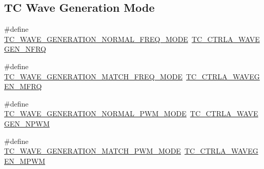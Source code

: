 \subsection*{TC Wave Generation Mode}
\begin{DoxyCompactItemize}
\item 
\#define \mbox{\hyperlink{group__asfdoc__sam0__tc__group_ga3be501afca9dd97d2adb1959f30816a7}{T\+C\+\_\+\+W\+A\+V\+E\+\_\+\+G\+E\+N\+E\+R\+A\+T\+I\+O\+N\+\_\+\+N\+O\+R\+M\+A\+L\+\_\+\+F\+R\+E\+Q\+\_\+\+M\+O\+DE}}~\mbox{\hyperlink{group___s_a_m_d21___t_c_ga3d7b144f5e197d57332ab754b75b12c9}{T\+C\+\_\+\+C\+T\+R\+L\+A\+\_\+\+W\+A\+V\+E\+G\+E\+N\+\_\+\+N\+F\+RQ}}
\item 
\#define \mbox{\hyperlink{group__asfdoc__sam0__tc__group_ga65ebbd3eaea3bd9cf6f81392770caae6}{T\+C\+\_\+\+W\+A\+V\+E\+\_\+\+G\+E\+N\+E\+R\+A\+T\+I\+O\+N\+\_\+\+M\+A\+T\+C\+H\+\_\+\+F\+R\+E\+Q\+\_\+\+M\+O\+DE}}~\mbox{\hyperlink{group___s_a_m_d21___t_c_ga481c00b2ec0ab62d5c321b1f3fb32493}{T\+C\+\_\+\+C\+T\+R\+L\+A\+\_\+\+W\+A\+V\+E\+G\+E\+N\+\_\+\+M\+F\+RQ}}
\item 
\#define \mbox{\hyperlink{group__asfdoc__sam0__tc__group_gaa7277c5eaa031dbd06159cd533346210}{T\+C\+\_\+\+W\+A\+V\+E\+\_\+\+G\+E\+N\+E\+R\+A\+T\+I\+O\+N\+\_\+\+N\+O\+R\+M\+A\+L\+\_\+\+P\+W\+M\+\_\+\+M\+O\+DE}}~\mbox{\hyperlink{group___s_a_m_d21___t_c_ga74de3c0bcf4adf87189c90b28cd7310d}{T\+C\+\_\+\+C\+T\+R\+L\+A\+\_\+\+W\+A\+V\+E\+G\+E\+N\+\_\+\+N\+P\+WM}}
\item 
\#define \mbox{\hyperlink{group__asfdoc__sam0__tc__group_ga4636ecc5d5a67c47a8b6551568c31ee6}{T\+C\+\_\+\+W\+A\+V\+E\+\_\+\+G\+E\+N\+E\+R\+A\+T\+I\+O\+N\+\_\+\+M\+A\+T\+C\+H\+\_\+\+P\+W\+M\+\_\+\+M\+O\+DE}}~\mbox{\hyperlink{group___s_a_m_d21___t_c_gac9b02e2cfc519e0fc97c3b89efdc7be1}{T\+C\+\_\+\+C\+T\+R\+L\+A\+\_\+\+W\+A\+V\+E\+G\+E\+N\+\_\+\+M\+P\+WM}}
\end{DoxyCompactItemize}
